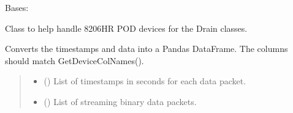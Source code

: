 \documentclass[letterpaper,10pt,english]{sphinxmanual}
\begin{document}
\begin{fulllineitems}
\label{\detokenize{Morelia.Stream.PodHandler:Morelia.Stream.PodHandler.Handle8206HR.Drain8206HR}}
\pysigstartsignatures
{}
\pysigstopsignatures
\sphinxAtStartPar
Bases: {\hyperref[\detokenize{Morelia.Stream.PodHandler:Morelia.Stream.PodHandler.HandlerInterface.DrainDeviceHandler}]{}}

\sphinxAtStartPar
Class to help handle 8206\sphinxhyphen{}HR POD devices for the Drain classes.

\begin{fulllineitems}
\label{\detokenize{Morelia.Stream.PodHandler:Morelia.Stream.PodHandler.Handle8206HR.Drain8206HR.DropToDf}}
\pysigstartsignatures
{}
\pysigstopsignatures
\sphinxAtStartPar
Converts the timestamps and data into a Pandas DataFrame. The columns should         match GetDeviceColNames().
\begin{quote}\begin{description}
\begin{itemize}
\item {} 
\sphinxAtStartPar
{} (\sphinxstyleliteralemphasis{\sphinxupquote{{[}}}\sphinxstyleliteralemphasis{\sphinxupquote{{]}}}) \textendash{} List of timestamps in seconds for each data packet.

\item {} 
\sphinxAtStartPar
{} (\sphinxstyleliteralemphasis{\sphinxupquote{{[}}}{\hyperref[\detokenize{Morelia.Packets:Morelia.Packets.Packet.Packet}]{\sphinxcrossref{\sphinxstyleliteralemphasis{\sphinxupquote{Packet}}}}}\sphinxstyleliteralemphasis{\sphinxupquote{ | }}\sphinxstyleliteralemphasis{\sphinxupquote{{]}}}) \textendash{} List of streaming binary data packets.


\end{itemize}
\end{description}
\end{quote}
\end{fulllineitems}
\end{fulllineitems}
\end{document}
